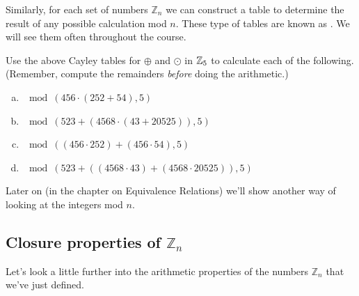 Similarly, for each set of numbers ${\mathbb Z}_n$ we can construct a table to determine the result of any possible calculation mod $n$.
These type of tables are known as .  We will see them often throughout the course.

\begin{exercise}{49}
Use the above Cayley tables for $\oplus$ and $\odot$  in $\mathbb{Z}_5$ to calculate each of the following.  (Remember, compute the remainders \emph{before} doing the arithmetic.)

\begin{enumerate}[(a)]
\item
$ \mod(456 \cdot (252 + 54),5) $
\item
$ \mod(523 + \left( 4568 \cdot (43 + 20525) \right),5)$
\item
$\mod((456 \cdot 252) + (456 \cdot 54),5) $
\item
$ \mod(523 + \left( (4568 \cdot 43) + (4568 \cdot 20525) \right) ,5)$
\end{enumerate}
\end{exercise}



\noindent
Later on (in the chapter on Equivalence Relations) we'll show another way of looking at the integers mod $n$.

\subsection{Closure properties of ${\mathbb Z}_n$}\label{sec:ClosureZn}

Let's look a little further into the arithmetic properties of the numbers ${\mathbb Z}_n$ that we've just defined. 


